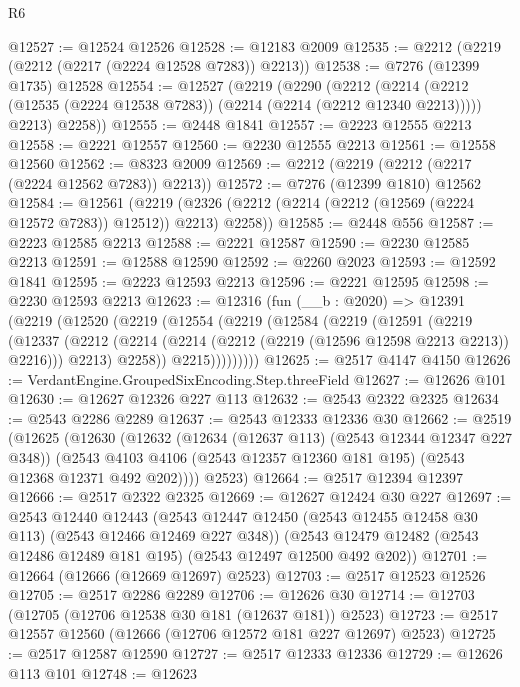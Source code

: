 \begin{lexlean}{R6}
\begin{coremodule}
@12527 := @12524 @12526
@12528 := @12183 @2009
@12535 := @2212 (@2219 (@2212 (@2217 (@2224 @12528 @7283)) @2213))
@12538 := @7276 (@12399 @1735) @12528
@12554 := @12527
    (@2219
      (@2290
        (@2212
          (@2214 (@2212 (@12535 (@2224 @12538 @7283)) (@2214 (@2214 (@2212 @12340 @2213)))))
          @2213)
        @2258))
@12555 := @2448 @1841
@12557 := @2223 @12555 @2213
@12558 := @2221 @12557
@12560 := @2230 @12555 @2213
@12561 := @12558 @12560
@12562 := @8323 @2009
@12569 := @2212 (@2219 (@2212 (@2217 (@2224 @12562 @7283)) @2213))
@12572 := @7276 (@12399 @1810) @12562
@12584 := @12561
    (@2219 (@2326 (@2212 (@2214 (@2212 (@12569 (@2224 @12572 @7283)) @12512)) @2213) @2258))
@12585 := @2448 @556
@12587 := @2223 @12585 @2213
@12588 := @2221 @12587
@12590 := @2230 @12585 @2213
@12591 := @12588 @12590
@12592 := @2260 @2023
@12593 := @12592 @1841
@12595 := @2223 @12593 @2213
@12596 := @2221 @12595
@12598 := @2230 @12593 @2213
@12623 := @12316
    (fun (__b : @2020) =>
    @12391
      (@2219
        (@12520
          (@2219
            (@12554
              (@2219
                (@12584
                  (@2219
                    (@12591
                      (@2219
                        (@12337
                          (@2212
                            (@2214 (@2214 (@2212 (@2219 (@12596 @12598 @2213 @2213)) @2216)))
                            @2213)
                          @2258))
                      @2215)))))))))
@12625 := @2517 @4147 @4150
@12626 := VerdantEngine.GroupedSixEncoding.Step.threeField
@12627 := @12626 @101
@12630 := @12627 @12326 @227 @113
@12632 := @2543 @2322 @2325
@12634 := @2543 @2286 @2289
@12637 := @2543 @12333 @12336 @30
@12662 := @2519
    (@12625
      (@12630
        (@12632
          (@12634 (@12637 @113) (@2543 @12344 @12347 @227 @348))
          (@2543 @4103 @4106 (@2543 @12357 @12360 @181 @195) (@2543 @12368 @12371 @492 @202))))
      @2523)
@12664 := @2517 @12394 @12397
@12666 := @2517 @2322 @2325
@12669 := @12627 @12424 @30 @227
@12697 := @2543
    @12440
    @12443
    (@2543 @12447 @12450 (@2543 @12455 @12458 @30 @113) (@2543 @12466 @12469 @227 @348))
    (@2543 @12479 @12482 (@2543 @12486 @12489 @181 @195) (@2543 @12497 @12500 @492 @202))
@12701 := @12664 (@12666 (@12669 @12697) @2523)
@12703 := @2517 @12523 @12526
@12705 := @2517 @2286 @2289
@12706 := @12626 @30
@12714 := @12703 (@12705 (@12706 @12538 @30 @181 (@12637 @181)) @2523)
@12723 := @2517 @12557 @12560 (@12666 (@12706 @12572 @181 @227 @12697) @2523)
@12725 := @2517 @12587 @12590
@12727 := @2517 @12333 @12336
@12729 := @12626 @113 @101
@12748 := @12623

\end{coremodule}
\end{lexlean}
